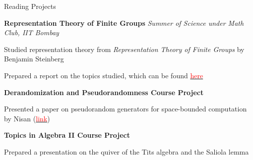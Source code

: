 
\begin{rubric}{Reading Projects}

	\entry*[2022] \textbf{Representation Theory of Finite Groups} \hfill \emph{Summer of Science under Math Club, IIT Bombay}

		Studied representation theory from \emph{Representation Theory of Finite Groups} by Benjamin Steinberg

		Prepared a report on the topics studied, which can be found \href{https://amitrajaraman.github.io/notes/rep-th/main.pdf}{\textcolor{red}{here}}

	\entry*[2022\phantom{}] \textbf{Derandomization and Pseudorandomness Course Project}

		Presented a paper on pseudorandom generators for space-bounded computation by Nisan (\href{https://link.springer.com/article/10.1007/BF01305237}{\textcolor{red}{link}})

	\entry*[2020\phantom{}] \textbf{Topics in Algebra II Course Project}

		Prepared a presentation on the quiver of the Tits algebra and the Saliola lemma


		






        
\end{rubric}